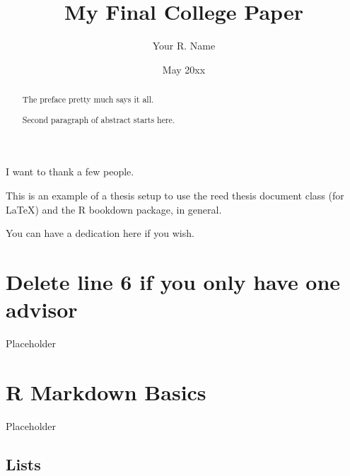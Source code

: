\documentclass[12pt,twoside]{reedthesis}
\title{My Final College Paper}
\author{Your R. Name}
\date{May 20xx}
\begin{document}
  \maketitle

\frontmatter %
\pagestyle{empty} %
  \begin{acknowledgements}
    I want to thank a few people.
  \end{acknowledgements}
  \begin{preface}
    This is an example of a thesis setup to use the reed thesis document class
    (for LaTeX) and the R bookdown package, in general.
  \end{preface}
  \hypersetup{linkcolor=black}
  \setcounter{tocdepth}{2}
  \tableofcontents

  \listoftables

  \listoffigures
  \begin{abstract}
    The preface pretty much says it all.
    
    \par
    
    Second paragraph of abstract starts here.
  \end{abstract}
  \begin{dedication}
    You can have a dedication here if you wish.
  \end{dedication}
\mainmatter %
\pagestyle{fancyplain} %

\hypertarget{delete-line-6-if-you-only-have-one-advisor}{%
\chapter{Delete line 6 if you only have one advisor}\label{delete-line-6-if-you-only-have-one-advisor}}

Placeholder

\hypertarget{rmd-basics}{%
\chapter{R Markdown Basics}\label{rmd-basics}}

Placeholder

\hypertarget{lists}{%
\section{Lists}\label{lists}}
\end{document}
